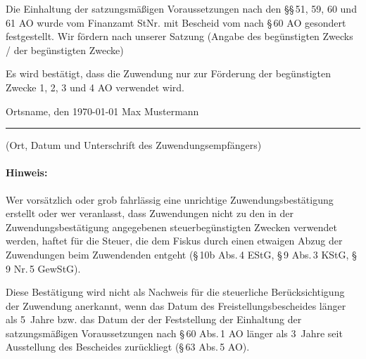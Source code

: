 \documentclass[12pt,ngerman]{scrartcl}
\newcommand{\notmarked}{\scalebox{1.5}{\Square}}
\begin{document}
\notmarked Die Einhaltung der satzungsmäßigen Voraussetzungen nach den §§\,51, 59, 60 und 61 AO wurde vom Finanzamt \hdashrule{2cm}{1pt}{1pt} StNr. \hdashrule{2cm}{1pt}{1pt} mit Bescheid vom\hdashrule{2cm}{1pt}{1pt} nach §\,60 AO gesondert festgestellt. Wir fördern nach unserer Satzung (Angabe des begünstigten Zwecks / der begünstigten Zwecke) \hdashrule{2cm}{1pt}{1pt}
 
\begin{mdframed}[style=MyFormStyle]%
Es wird bestätigt, dass die Zuwendung nur zur Förderung der begünstigten Zwecke 1, 2, 3 und 4 AO verwendet wird. 
\end{mdframed} 


\vspace*{2.5em} 

Ortsname, den \today \hspace*{20em} Max Mustermann

\hrule

\vspace*{0.5em} (Ort, Datum und Unterschrift des Zuwendungsempfängers) 

\paragraph{Hinweis:} Wer vorsätzlich oder grob fahrlässig eine unrichtige Zuwendungsbestätigung erstellt oder wer veranlasst, dass 
Zuwendungen nicht zu den in der Zuwendungsbestätigung angegebenen steuerbegünstigten Zwecken verwendet 
werden, haftet für die Steuer, die dem Fiskus durch einen etwaigen Abzug der Zuwendungen beim Zuwendenden entgeht (§\,10b Abs.\,4 EStG, §\,9 Abs.\,3 KStG, §\,9 Nr.\,5 GewStG). 

Diese Bestätigung wird nicht als Nachweis für die steuerliche Berücksichtigung der Zuwendung anerkannt, wenn das Datum des Freistellungsbescheides länger als 5~Jahre bzw. das Datum der der Feststellung der Einhaltung der satzungsmäßigen Voraussetzungen nach §\,60 Abs.\,1 AO länger als 3~Jahre seit Ausstellung des Bescheides zurückliegt (§\,63 Abs.\,5 AO). 
\end{document}

